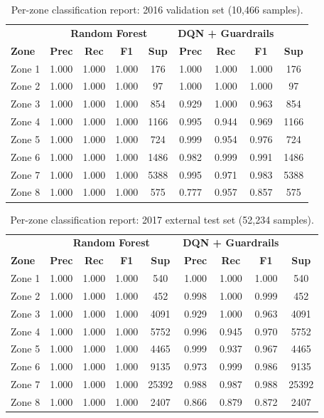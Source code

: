\begin{table}[h]
\centering
\caption{Per-zone classification report: 2016 validation set (10,466 samples).
}
\label{tab:perzone:val}
\small
\begin{tabular}{lcccccccc}
\toprule
 & \multicolumn{4}{c}{\textbf{Random Forest}} & \multicolumn{3}{c}{\textbf{DQN + Guardrails}} & \\
\textbf{Zone} & \textbf{Prec} & \textbf{Rec} & \textbf{F1} & \textbf{Sup} & \textbf{Prec} & \textbf{Rec} & \textbf{F1} & \textbf{Sup} \\
\midrule
Zone 1 & 1.000 & 1.000 & 1.000 & 176  & 1.000 & 1.000 & 1.000 & 176 \\
Zone 2 & 1.000 & 1.000 & 1.000 & 97   & 1.000 & 1.000 & 1.000 & 97 \\
Zone 3 & 1.000 & 1.000 & 1.000 & 854  & 0.929 & 1.000 & 0.963 & 854 \\
Zone 4 & 1.000 & 1.000 & 1.000 & 1166 & 0.995 & 0.944 & 0.969 & 1166 \\
Zone 5 & 1.000 & 1.000 & 1.000 & 724  & 0.999 & 0.954 & 0.976 & 724 \\
Zone 6 & 1.000 & 1.000 & 1.000 & 1486 & 0.982 & 0.999 & 0.991 & 1486 \\
Zone 7 & 1.000 & 1.000 & 1.000 & 5388 & 0.995 & 0.971 & 0.983 & 5388 \\
Zone 8 & 1.000 & 1.000 & 1.000 & 575  & 0.777 & 0.957 & 0.857 & 575 \\
\bottomrule
\end{tabular}
\end{table}

\begin{table}[h]
\centering
\caption{Per-zone classification report: 2017 external test set (52,234 samples).
}
\label{tab:perzone:ext}
\small
\begin{tabular}{lcccccccc}
\toprule
 & \multicolumn{4}{c}{\textbf{Random Forest}} & \multicolumn{3}{c}{\textbf{DQN + Guardrails}} & \\
\textbf{Zone} & \textbf{Prec} & \textbf{Rec} & \textbf{F1} & \textbf{Sup} & \textbf{Prec} & \textbf{Rec} & \textbf{F1} & \textbf{Sup} \\
\midrule
Zone 1 & 1.000 & 1.000 & 1.000 & 540   & 1.000 & 1.000 & 1.000 & 540 \\
Zone 2 & 1.000 & 1.000 & 1.000 & 452   & 0.998 & 1.000 & 0.999 & 452 \\
Zone 3 & 1.000 & 1.000 & 1.000 & 4091  & 0.929 & 1.000 & 0.963 & 4091 \\
Zone 4 & 1.000 & 1.000 & 1.000 & 5752  & 0.996 & 0.945 & 0.970 & 5752 \\
Zone 5 & 1.000 & 1.000 & 1.000 & 4465  & 0.999 & 0.937 & 0.967 & 4465 \\
Zone 6 & 1.000 & 1.000 & 1.000 & 9135  & 0.973 & 0.999 & 0.986 & 9135 \\
Zone 7 & 1.000 & 1.000 & 1.000 & 25392 & 0.988 & 0.987 & 0.988 & 25392 \\
Zone 8 & 1.000 & 1.000 & 1.000 & 2407  & 0.866 & 0.879 & 0.872 & 2407 \\
\bottomrule
\end{tabular}
\end{table}

